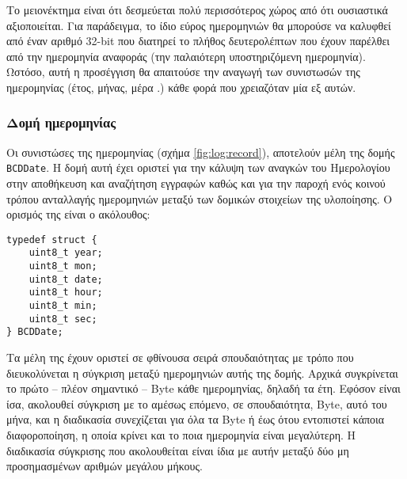 Το μειονέκτημα είναι ότι δεσμεύεται πολύ περισσότερος χώρος από ότι ουσιαστικά
αξιοποιείται. Για παράδειγμα, το ίδιο εύρος ημερομηνιών θα μπορούσε να καλυφθεί
από έναν αριθμό 32-bit που διατηρεί το πλήθος δευτερολέπτων που έχουν παρέλθει
από την ημερομηνία αναφοράς (την παλαιότερη υποστηριζόμενη ημερομηνία). Ωστόσο,
αυτή η προσέγγιση θα απαιτούσε την αναγωγή των συνιστωσών της ημερομηνίας (έτος,
μήνας, μέρα \etc.) κάθε φορά που χρειαζόταν μία εξ αυτών.



\subsubsection{Δομή ημερομηνίας}

Οι συνιστώσες της ημερομηνίας (σχήμα \ref{fig:log:record}), αποτελούν μέλη της
δομής \verb~BCDDate~. Η δομή αυτή έχει οριστεί για την κάλυψη των αναγκών του
Ημερολογίου στην αποθήκευση και αναζήτηση εγγραφών καθώς και για την παροχή ενός
κοινού τρόπου ανταλλαγής ημερομηνιών μεταξύ των δομικών στοιχείων της
υλοποίησης. Ο ορισμός της είναι ο ακόλουθος:
\begin{lstlisting}
typedef struct {
    uint8_t year;
    uint8_t mon;
    uint8_t date;
    uint8_t hour;
    uint8_t min;
    uint8_t sec;
} BCDDate;
\end{lstlisting}

Τα μέλη της έχουν οριστεί σε φθίνουσα σειρά σπουδαιότητας με τρόπο που
διευκολύνεται η σύγκριση μεταξύ ημερομηνιών αυτής της δομής. Αρχικά συγκρίνεται
το πρώτο -- πλέον σημαντικό -- Byte κάθε ημερομηνίας, δηλαδή τα έτη. Εφόσον
είναι ίσα, ακολουθεί σύγκριση με το αμέσως επόμενο, σε σπουδαιότητα, Byte, αυτό
του μήνα, και η διαδικασία συνεχίζεται για όλα τα Byte ή έως ότου εντοπιστεί
κάποια διαφοροποίηση, η οποία κρίνει και το ποια ημερομηνία είναι μεγαλύτερη.
Η διαδικασία σύγκρισης που ακολουθείται είναι ίδια με αυτήν μεταξύ δύο μη
προσημασμένων αριθμών μεγάλου μήκους.

%
%

